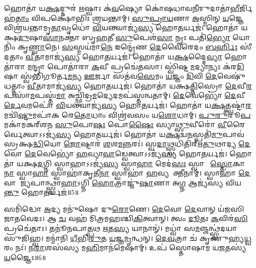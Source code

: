 𑌹𑍋𑌤𑌾॑ 𑌯\ul{𑌕𑍍𑌷}𑌦𑍍𑌦𑍁𑌰॑ \ul{𑌋}𑌷𑍍𑌵𑌾𑌃 𑌕॑\ul{𑌵}𑌷𑍍𑌯𑍋 𑌕𑍋॑𑌷𑌧𑌾𑌵\ul{𑌨𑍀}𑌰𑍁𑌦𑌾𑌤𑌾॑\ul{𑌭𑍀}𑌰𑍍𑌜𑌿𑌹॑\ul{𑌤𑌾𑌂} 𑌵𑌿𑌪𑌕𑍍𑌷𑍋॑𑌭𑌿𑌃 𑌶𑍍𑌰𑌯𑌨𑍍𑌤𑌾𑌮𑍍।
\ul{𑌸𑍁}\ul{𑌪𑍍𑌰𑌾}\ul{𑌯}𑌣𑌾 \ul{𑌅}𑌸𑍍𑌮𑌿𑌨𑍍 \ul{𑌯}𑌜𑍍𑌞𑍇 𑌵𑌿𑌶𑍍𑌰॑𑌯𑌨𑍍𑌤𑌾𑌮𑍃\ul{𑌤𑌾}𑌵𑍃𑌧𑍋॑ \ul{𑌵𑌿}𑌯𑌨𑍍𑌤𑍍𑌵𑌾𑌜𑍍𑌯॑\ul{𑌸𑍍𑌯} 𑌹𑍋\ul{𑌤}𑌰𑍍𑌯𑌜॑।
𑌹𑍋𑌤𑌾॑ 𑌯𑌕𑍍𑌷\ul{𑌦𑍁}𑌷𑌾\ul{𑌸𑌾}𑌨𑌕𑍍𑌤𑌾॑ 𑌬𑍃\ul{𑌹}𑌤𑍀 \ul{𑌸𑍁}𑌪𑍇𑌶॑\ul{𑌸𑌾} 𑌨𑍄𑌃 𑌪𑌤𑌿॑\ul{𑌭𑍍𑌯𑍋} 𑌯𑍋𑌨𑌿𑌂॑ 𑌕𑍃\ul{𑌣𑍍𑌵𑌾}𑌨𑍇।
\ul{𑌸}\ul{}𑌸𑍍𑌮𑌯॑𑌮𑌾\ul{𑌨𑍇} 𑌇𑌨𑍍𑌦𑍍𑌰𑍇॑𑌣 \ul{𑌦𑍇}𑌵𑍈𑌰𑍇𑌦𑌂 \ul{𑌬}\ul{𑌰𑍍}𑌹𑌿𑌃 𑌸𑍀॑𑌦𑌤𑌾𑌂 \ul{𑌵𑍀}𑌤𑌾𑌮𑌾𑌜𑍍𑌯॑\ul{𑌸𑍍𑌯} 𑌹𑍋\ul{𑌤}𑌰𑍍𑌯𑌜॑।
𑌹𑍋𑌤𑌾॑ 𑌯\ul{𑌕𑍍𑌷}𑌦𑍍𑌦𑍈\ul{𑌵𑍍𑌯𑌾} 𑌹𑍋𑌤𑌾॑𑌰𑌾 \ul{𑌮}𑌨𑍍𑌦𑍍𑌰𑌾 𑌪𑍋𑌤𑌾॑𑌰𑌾 \ul{𑌕}𑌵𑍀 𑌪𑍍𑌰𑌚𑍇॑𑌤𑌸𑌾।
𑌸𑍍𑌵𑌿॑𑌷𑍍𑌟\ul{𑌮}𑌦𑍍𑌯𑌾𑌨𑍍𑌯𑌃 𑌕॑𑌰\ul{𑌦𑌿}𑌷𑌾 𑌸𑍍𑌵॑𑌭𑌿𑌗𑍂𑌰𑍍𑌤\ul{𑌮}𑌨𑍍𑌯 \ul{𑌊}𑌰𑍍𑌜𑌾 𑌸𑌤॑𑌵\ul{𑌸𑍇}𑌮𑌂 \ul{𑌯}𑌜𑍍𑌞𑌂 \ul{𑌦𑌿}𑌵𑌿 \ul{𑌦𑍇}𑌵𑍇𑌷𑍁॑ 𑌧𑌤𑍍𑌤𑌾𑌂 \ul{𑌵𑍀}𑌤𑌾𑌮𑌾𑌜𑍍𑌯॑\ul{𑌸𑍍𑌯} 𑌹𑍋\ul{𑌤}𑌰𑍍𑌯𑌜॑।
𑌹𑍋𑌤𑌾॑ 𑌯𑌕𑍍𑌷\ul{𑌤𑍍𑌤𑌿}𑌸𑍍𑌰𑍋 \ul{𑌦𑍇}𑌵𑍀\ul{𑌰}𑌪𑌸𑌾॑\ul{𑌮}𑌪𑌸𑍍𑌤॑\ul{𑌮𑌾} 𑌅𑌚𑍍𑌛𑌿॑𑌦𑍍𑌰\ul{𑌮}𑌦𑍍𑌯𑍇𑌦𑌮𑌪॑𑌸𑍍𑌤𑌨𑍍𑌵𑌤𑌾𑌮𑍍।
\ul{𑌦𑍇}𑌵𑍇𑌭𑍍𑌯𑍋॑ \ul{𑌦𑍇}𑌵𑍀\ul{𑌰𑍍𑌦𑍇}𑌵𑌮𑌪𑍋॑ \ul{𑌵𑌿}𑌯𑌨𑍍𑌤𑍍𑌵𑌾𑌜𑍍𑌯॑\ul{𑌸𑍍𑌯} 𑌹𑍋\ul{𑌤}𑌰𑍍𑌯𑌜॑।
𑌹𑍋𑌤𑌾॑ 𑌯\ul{𑌕𑍍𑌷}𑌤𑍍𑌤𑍍𑌵𑌷𑍍𑌟𑌾॑\ul{𑌰}𑌮𑌚𑌿॑\ul{𑌷𑍍𑌟𑍁}𑌮𑌪𑌾॑𑌕 𑌰𑍇\ul{𑌤𑍋}𑌧𑌾𑌂 𑌵𑌿𑌶𑍍𑌰॑𑌵𑌸𑌂 𑌯\ul{𑌶𑍋}𑌧𑌾𑌮𑍍।
\ul{𑌪𑍁}\ul{𑌰𑍁}𑌰𑍂\ul{𑌪}𑌮𑌕𑌾॑𑌮𑌕𑌰𑍍‌\mbox{}𑌶𑌨 \ul{𑌸𑍁}𑌪𑍋\ul{𑌷𑌃} 𑌪𑍋\ul{𑌷𑍈𑌃} 𑌸𑍍𑌯𑌾\ul{𑌥𑍍𑌸𑍁}𑌵𑍀𑌰𑍋॑ \ul{𑌵𑍀}𑌰𑍈𑌰𑍍𑌵𑍇𑌤𑍍𑌵𑌾𑌽𑌽𑌜𑍍𑌯॑\ul{𑌸𑍍𑌯} 𑌹𑍋\ul{𑌤}𑌰𑍍𑌯𑌜॑।
𑌹𑍋𑌤𑌾॑ 𑌯\ul{𑌕𑍍𑌷}𑌦𑍍𑌵\ul{𑌨}𑌸𑍍𑌪𑌤𑌿॑\ul{𑌮𑍁}𑌪𑌾𑌵॑𑌸𑍍𑌰𑌕𑍍𑌷\ul{𑌦𑍍𑌧𑌿}𑌯𑍋 \ul{𑌜𑍋}𑌷𑍍𑌟𑌾𑌰॑ \ul{𑌶}𑌶\ul{𑌮}𑌨𑍍𑌨𑌰𑌃॑।
𑌸𑍍𑌵\ul{𑌦𑌾}𑌥𑍍𑌸𑍍𑌵𑌧𑌿॑𑌤𑌿𑌰𑍍\mbox{}𑌋\ul{𑌤𑍁}𑌥𑌾𑌦𑍍𑌯 \ul{𑌦𑍇}𑌵𑍋 \ul{𑌦𑍇}𑌵𑍇𑌭𑍍𑌯𑍋॑ \ul{𑌹}𑌵𑍍𑌯𑌾\ul{𑌵𑌾}𑌡𑍍𑌵𑍇𑌤𑍍𑌵𑌾𑌽𑌽𑌜𑍍𑌯॑\ul{𑌸𑍍𑌯} 𑌹𑍋\ul{𑌤}𑌰𑍍𑌯𑌜॑।
𑌹𑍋𑌤𑌾॑ 𑌯𑌕𑍍𑌷\ul{𑌦}𑌗𑍍𑌨𑌿 𑌸𑍍𑌵𑌾𑌹𑌾\-𑌽𑌽𑌜𑍍𑌯॑\ul{𑌸𑍍𑌯} 𑌸𑍍𑌵𑌾\ul{𑌹𑌾} 𑌮𑍇𑌦॑\ul{𑌸𑌃} 𑌸𑍍𑌵𑌾𑌹𑌾᳚ \ul{𑌸𑍍𑌤𑍋}𑌕𑌾\ul{𑌨𑌾}\ul{} 𑌸𑍍𑌵𑌾\ul{𑌹𑌾} 𑌸𑍍𑌵𑌾𑌹𑌾॑𑌕𑍃𑌤𑍀\ul{𑌨𑌾}\ul{} 𑌸𑍍𑌵𑌾𑌹𑌾॑ \ul{𑌹}𑌵𑍍𑌯𑌸𑍂᳚𑌕𑍍𑌤𑍀𑌨𑌾𑌮𑍍।
𑌸𑍍𑌵𑌾𑌹𑌾॑ \ul{𑌦𑍇}𑌵𑌾 𑌆᳚\ul{𑌜𑍍𑌯}𑌪𑌾𑌨𑍍𑌥𑍍𑌸𑍍𑌵𑌾\ul{𑌹𑌾}\-𑌽𑌗𑍍𑌨𑌿 \ul{𑌹𑍋}𑌤𑍍𑌰𑌾𑌜𑍍𑌜𑍁॑\ul{𑌷𑌾}𑌣𑌾 𑌅\ul{𑌗𑍍𑌨} 𑌆𑌜𑍍𑌯॑𑌸𑍍𑌯 𑌵𑌿𑌯\ul{𑌨𑍍𑌤𑍁} 𑌹𑍋\ul{𑌤}𑌰𑍍𑌯𑌜॑॥5॥

𑌸𑌮𑌿॑𑌦𑍍𑌧𑍋 \ul{𑌅}𑌦𑍍𑌯 𑌮𑌨𑍁॑𑌷𑍋 𑌦𑍁\ul{𑌰𑍋}𑌣𑍇।
\ul{𑌦𑍇}𑌵𑍋 \ul{𑌦𑍇}𑌵𑌾𑌨𑍍 𑌯॑𑌜𑌸𑌿 𑌜𑌾𑌤𑌵𑍇𑌦𑌃।
𑌆 \ul{𑌚} 𑌵𑌹॑ 𑌮𑌿𑌤𑍍𑌰𑌮𑌹𑌶𑍍𑌚𑌿\ul{𑌕𑌿}𑌤𑍍𑌵𑌾𑌨𑍍।
𑌤𑍍𑌵𑌂 \ul{𑌦𑍂}𑌤𑌃 \ul{𑌕}𑌵𑌿𑌰॑\ul{𑌸𑌿} 𑌪𑍍𑌰𑌚𑍇॑𑌤𑌾𑌃।
𑌤𑌨𑍂॑𑌨𑌪𑌾\ul{𑌤𑍍𑌪}𑌥 \ul{𑌋}𑌤\ul{𑌸𑍍𑌯} 𑌯𑌾𑌨𑌾𑌨𑍍॑।
𑌮𑌧𑍍𑌵𑌾॑ 𑌸\ul{𑌮}𑌞𑍍𑌜𑌨𑍍𑌥𑍍𑌸𑍍𑌵॑𑌦𑌯𑌾 𑌸𑍁𑌜𑌿𑌹𑍍𑌵।
𑌮𑌨𑍍𑌮𑌾॑𑌨𑌿 \ul{𑌧𑍀}𑌭𑌿\ul{𑌰𑍁}𑌤 \ul{𑌯}𑌜𑍍𑌞\ul{𑌮𑍃}𑌨𑍍𑌧𑌨𑍍।
\ul{𑌦𑍇}\ul{𑌵}𑌤𑍍𑌰𑌾 𑌚॑ 𑌕𑍃𑌣𑍁𑌹𑍍𑌯\ul{𑌧𑍍𑌵}𑌰𑌂 𑌨𑌃॑।
𑌨\ul{𑌰𑌾}𑌶𑌸॑𑌸𑍍𑌯 𑌮\ul{𑌹𑌿}𑌮𑌾𑌨॑𑌮𑍇𑌷𑌾𑌮𑍍।
𑌉𑌪॑ 𑌸𑍍𑌤𑍋𑌷𑌾𑌮 𑌯\ul{𑌜}𑌤𑌸𑍍𑌯॑ \ul{𑌯}𑌜𑍍𑌞𑍈𑌃॥6॥

